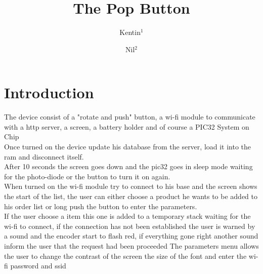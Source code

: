 \documentclass[
10pt,
a4paper,
]{article}
\title{The Pop Button}
\author{Kentin$^{1}$ \and Nil$^{2}$ }
\begin{document}
\maketitle
{}

\section{Introduction}
The device consist of a "rotate and push" button, a wi-fi module to communicate with a http server, a screen, a battery holder and of course a PIC32 System on Chip\\
Once turned on the device update his database from the server, load it into the ram and disconnect itself.\\
After 10 seconds the screen goes down and the pic32 goes in sleep mode waiting for the photo-diode or the button to turn it on again.\\
When turned on the wi-fi module try to connect to his base and the screen shows the start of the list, the user can either choose a product he wants to be added to his order list or long push the button to enter the parameters.\\
If the user choose a item this one is added to a temporary stack waiting for the wi-fi to connect, if the connection has not been established the user is warned by a sound and the encoder start to flash red, if everything gone right another sound inform the user that the request had been proceeded  
The parameters menu allows the user to change the contrast of the screen the size of the font and enter the wi-fi password and ssid
\end{document}
